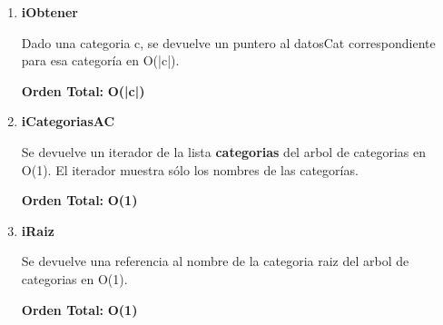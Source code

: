\vspace*{1em}
\begin{enumerate}






\item\textbf{iObtener}
\par Dado una categoria c, se devuelve un puntero al datosCat correspondiente para esa categoría en O(|c|).
\par \textbf{Orden Total:} \textbf{O(|c|)}

\item\textbf{iCategoriasAC}
\par Se devuelve un iterador de la lista \textbf{categorias} del arbol de categorias en O(1). El iterador muestra sólo los nombres de las categorías.
\par \textbf{Orden Total:} \textbf{O(1)}

\item\textbf{iRaiz}
\par Se devuelve una referencia al nombre de la categoria raiz del arbol de categorias en O(1).
\par \textbf{Orden Total:} \textbf{O(1)}


\end{enumerate}
